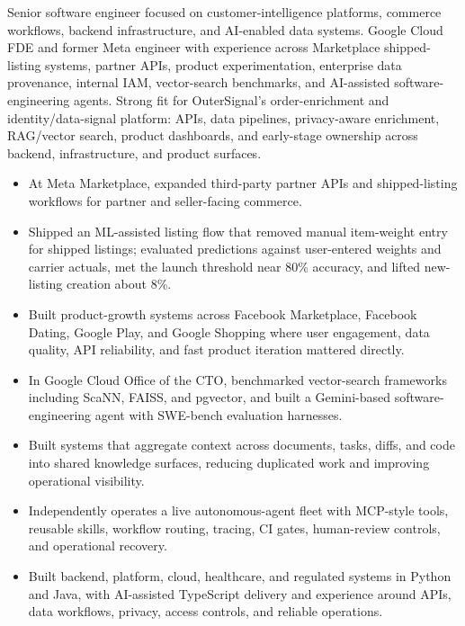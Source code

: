 


Senior software engineer focused on customer-intelligence platforms, commerce workflows, backend infrastructure, and AI-enabled data systems. Google Cloud FDE and former Meta engineer with experience across Marketplace shipped-listing systems, partner APIs, product experimentation, enterprise data provenance, internal IAM, vector-search benchmarks, and AI-assisted software-engineering agents. Strong fit for OuterSignal's order-enrichment and identity/data-signal platform: APIs, data pipelines, privacy-aware enrichment, RAG/vector search, product dashboards, and early-stage ownership across backend, infrastructure, and product surfaces.
\begin{itemize}
  \item At Meta Marketplace, expanded third-party partner APIs and shipped-listing workflows for partner and seller-facing commerce.
  \item Shipped an ML-assisted listing flow that removed manual item-weight entry for shipped listings; evaluated predictions against user-entered weights and carrier actuals, met the launch threshold near 80\% accuracy, and lifted new-listing creation about 8\%.
  \item Built product-growth systems across Facebook Marketplace, Facebook Dating, Google Play, and Google Shopping where user engagement, data quality, API reliability, and fast product iteration mattered directly.
\end{itemize}
\begin{itemize}
  \item In Google Cloud Office of the CTO, benchmarked vector-search frameworks including ScaNN, FAISS, and pgvector, and built a Gemini-based software-engineering agent with SWE-bench evaluation harnesses.
  \item Built systems that aggregate context across documents, tasks, diffs, and code into shared knowledge surfaces, reducing duplicated work and improving operational visibility.
  \item Independently operates a live autonomous-agent fleet with MCP-style tools, reusable skills, workflow routing, tracing, CI gates, human-review controls, and operational recovery.
  \item Built backend, platform, cloud, healthcare, and regulated systems in Python and Java, with AI-assisted TypeScript delivery and experience around APIs, data workflows, privacy, access controls, and reliable operations.
\end{itemize}




